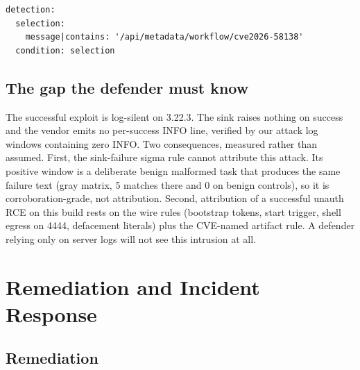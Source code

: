 \documentclass[journal]{IEEEtran}
\begin{document}
\begin{lstlisting}[style=yargen,caption={Sigma rule
\texttt{conductor\_cve\_\allowbreak named\_\allowbreak workflow\_\allowbreak metadata\_\allowbreak errors} (detection block
verbatim). Case-bound by design, it keys on the observed CVE-named workflow
artifact, which a real attacker may rename. The wire rules of
Listing~\ref{lst:suricata} do not depend on naming.},label={lst:sigma}]
detection:
  selection:
    message|contains: '/api/metadata/workflow/cve2026-58138'
  condition: selection
\end{lstlisting}

\subsection{The gap the defender must know}
\label{sec:silent}

The successful exploit is log-silent on 3.22.3. The sink raises nothing on
success and the vendor emits no per-success INFO line, verified by our attack
log windows containing zero INFO. Two consequences, measured rather than
assumed. First, the sink-failure sigma rule cannot attribute this attack. Its
positive window is a deliberate benign malformed task that produces the same
failure text (gray matrix, 5 matches there and 0 on benign controls), so it is
corroboration-grade, not attribution. Second, attribution of a successful
unauth RCE on this build rests on the wire rules (bootstrap tokens, start
trigger, shell egress on 4444, defacement literals) plus the CVE-named
artifact rule. A defender relying only on server logs will not see this
intrusion at all.

\section{Remediation and Incident Response}
\label{sec:remediation}

\subsection{Remediation}
\end{document}
